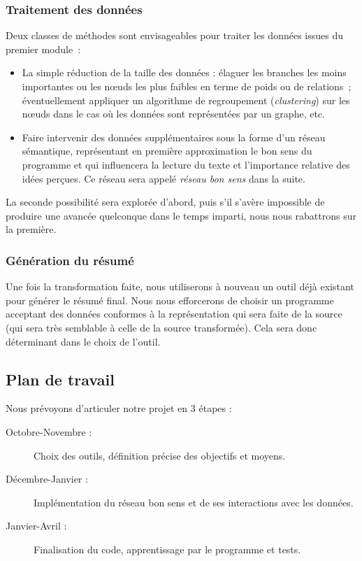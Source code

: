 \documentclass{article}           %
\begin{document}
\subsubsection{Traitement des données}

Deux classes de méthodes sont envisageables pour traiter les données issues du premier module~:

\begin{itemize}
  \item La simple réduction de la taille des données : élaguer les branches les moins importantes ou les nœuds les plus faibles en terme de poids ou de relations~; éventuellement appliquer un algorithme de regroupement (\emph{clustering}) sur les nœuds dans le cas où les données sont représentées par un graphe, etc.
  
  \item Faire intervenir des données supplémentaires sous la forme d'un réseau sémantique, représentant en première approximation le bon sens du programme et qui influencera la lecture du texte et l'importance relative des idées perçues. Ce réseau sera appelé \textit{réseau bon sens} dans la suite.
\end{itemize}
La seconde possibilité sera explorée d'abord, puis s'il s'avère impossible de produire une avancée quelconque dans le temps imparti, nous nous rabattrons sur la première.

\subsubsection{Génération du résumé}

Une fois la transformation faite, nous utiliserons à nouveau un outil déjà existant pour générer le résumé final. Nous nous efforcerons de choisir un programme acceptant des données conformes à la représentation qui sera faite de la source (qui sera très semblable à celle de la source transformée). Cela sera donc déterminant dans le choix de l'outil.

\subsection{Plan de travail}

Nous prévoyons d'articuler notre projet en 3 étapes :

\begin{description}
	\item[Octobre-Novembre :]Choix des outils, définition précise des objectifs et moyens.
	\item[Décembre-Janvier :]Implémentation du réseau bon sens et de ses interactions avec les données.
	\item[Janvier-Avril :]Finalisation du code, apprentissage par le programme et tests.
\end{description}
\end{document}
